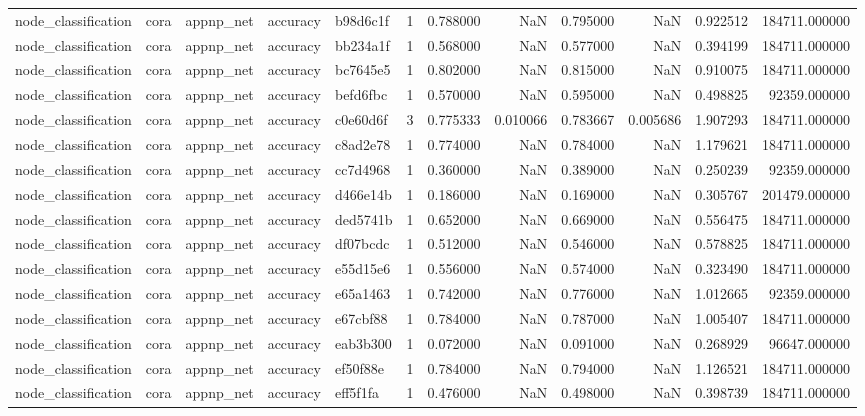 \begin{tabular}{lllllrrrrrrr}
node_classification & cora & appnp_net & accuracy & b98d6c1f & 1 & 0.788000 & NaN & 0.795000 & NaN & 0.922512 & 184711.000000 \\
node_classification & cora & appnp_net & accuracy & bb234a1f & 1 & 0.568000 & NaN & 0.577000 & NaN & 0.394199 & 184711.000000 \\
node_classification & cora & appnp_net & accuracy & bc7645e5 & 1 & 0.802000 & NaN & 0.815000 & NaN & 0.910075 & 184711.000000 \\
node_classification & cora & appnp_net & accuracy & befd6fbc & 1 & 0.570000 & NaN & 0.595000 & NaN & 0.498825 & 92359.000000 \\
node_classification & cora & appnp_net & accuracy & c0e60d6f & 3 & 0.775333 & 0.010066 & 0.783667 & 0.005686 & 1.907293 & 184711.000000 \\
node_classification & cora & appnp_net & accuracy & c8ad2e78 & 1 & 0.774000 & NaN & 0.784000 & NaN & 1.179621 & 184711.000000 \\
node_classification & cora & appnp_net & accuracy & cc7d4968 & 1 & 0.360000 & NaN & 0.389000 & NaN & 0.250239 & 92359.000000 \\
node_classification & cora & appnp_net & accuracy & d466e14b & 1 & 0.186000 & NaN & 0.169000 & NaN & 0.305767 & 201479.000000 \\
node_classification & cora & appnp_net & accuracy & ded5741b & 1 & 0.652000 & NaN & 0.669000 & NaN & 0.556475 & 184711.000000 \\
node_classification & cora & appnp_net & accuracy & df07bcdc & 1 & 0.512000 & NaN & 0.546000 & NaN & 0.578825 & 184711.000000 \\
node_classification & cora & appnp_net & accuracy & e55d15e6 & 1 & 0.556000 & NaN & 0.574000 & NaN & 0.323490 & 184711.000000 \\
node_classification & cora & appnp_net & accuracy & e65a1463 & 1 & 0.742000 & NaN & 0.776000 & NaN & 1.012665 & 92359.000000 \\
node_classification & cora & appnp_net & accuracy & e67cbf88 & 1 & 0.784000 & NaN & 0.787000 & NaN & 1.005407 & 184711.000000 \\
node_classification & cora & appnp_net & accuracy & eab3b300 & 1 & 0.072000 & NaN & 0.091000 & NaN & 0.268929 & 96647.000000 \\
node_classification & cora & appnp_net & accuracy & ef50f88e & 1 & 0.784000 & NaN & 0.794000 & NaN & 1.126521 & 184711.000000 \\
node_classification & cora & appnp_net & accuracy & eff5f1fa & 1 & 0.476000 & NaN & 0.498000 & NaN & 0.398739 & 184711.000000 \\

\end{tabular}
